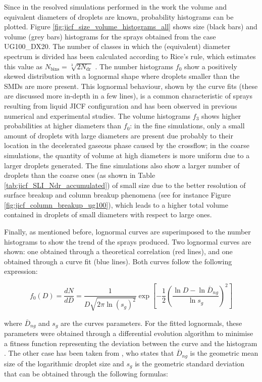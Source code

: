 Since in the resolved simulations performed in the work the volume and equivalent diameters of droplets are known, probability histograms can be plotted. Figure \ref{fig:jicf_size_volume_histograms_all} shows size (black bars) and volume (grey bars) histograms for the sprays obtained from the case UG100\_DX20. The number of classes in which the (equivalent) diameter spectrum is divided has been calculated according to Rice's rule, which estimates this value as $N_\mathrm{bins} = \sqrt[3]{2 N_\mathrm{dr}}$ . The number histograms $f_0$ show a positively skewed distribution with a lognormal shape where droplets smaller than the SMDs are more present. This lognormal behaviour, shown by the curve fits (these are discussed more in-depth in a few lines), is a common characteristic of sprays resulting from liquid JICF configuration and has been observed in previous numerical  and experimental  studies. The volume histograms $f_3$ shows higher probabilities at higher diameters than $f_0$: in the fine simulations, only a small amount of droplets with large diameters are present due probably to their location in the decelerated gaseous phase caused by the crossflow; in the coarse simulations, the quantity of volume at high diameters is more uniform due to a larger droplets generated. The fine simulations also show a larger number of droplets than the coarse ones (as shown in Table \ref{tab:jicf_SLI_Ndr_accumulated}) of small size due to the better resolution of surface breakup and column breakup phenomena (see for instance Figure \ref{fig:jicf_column_breakup_ug100}), which leads to a higher total volume contained in droplets of small diameters with respect to large ones.

Finally, as mentioned before, lognormal curves are superimposed to the number histograms to show the trend of the sprays produced. Two lognormal curves are shown: one obtained through a theoretical correlation (red lines), and one obtained through a curve fit (blue lines). Both curves follow the following expression:

\begin{equation}
 f_0 \left( D \right) = \frac{d N}{d D} =  \frac{1}{D  \sqrt{2 \pi \ln \left( s_g \right)^2}} \exp \left[ - \frac{1}{2 } \left( \frac{\ln D - \ln \overline{D}_{ng}}{\ln s_g}   \right)^2 \right]
\end{equation}

where $\overline{D}_{ng}$ and $s_g$ are the curves parameters. For the fitted lognormals, these parameters were obtained through a differential evolution algorithm to minimise a fitness function representing the deviation between the curve and the histogram . The other case has been taken from  , who states that $\overline{D}_{ng}$ is the geometric mean size of the logarithmic droplet size and $s_g$ is the geometric standard deviation that can be obtained through the following formulas: 


